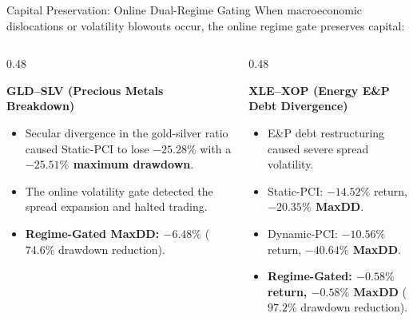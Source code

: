 \documentclass[10pt, aspectratio=169]{beamer}
\begin{document}
\begin{frame}{Capital Preservation: Online Dual-Regime Gating}
  When macroeconomic dislocations or volatility blowouts occur, the online regime gate preserves capital:
  \vspace{6pt}
  \begin{columns}[T]
    \begin{column}{0.48\textwidth}
      \begin{block}{\textbf{GLD--SLV (Precious Metals Breakdown)}}
        \begin{itemize}
          \item Secular divergence in the gold-silver ratio caused Static-PCI to lose $-25.28\%$ with a \textcolor{negred}{\textbf{$-25.51\%$ maximum drawdown}}.
          \item The online volatility gate detected the spread expansion and halted trading.
          \item \textbf{Regime-Gated MaxDD: \textcolor{posgreen}{$-6.48\%$}} ($\mathbf{74.6\%}$ drawdown reduction).
        \end{itemize}
      \end{block}
    \end{column}
    \begin{column}{0.48\textwidth}
      \begin{block}{\textbf{XLE--XOP (Energy E\&P Debt Divergence)}}
        \begin{itemize}
          \item E\&P debt restructuring caused severe spread volatility.
          \item Static-PCI: $-14.52\%$ return, \textcolor{negred}{\textbf{$-20.35\%$ MaxDD}}.
          \item Dynamic-PCI: $-10.56\%$ return, \textcolor{negred}{\textbf{$-40.64\%$ MaxDD}}.
          \item \textbf{Regime-Gated: \textcolor{posgreen}{$-0.58\%$ return, $-0.58\%$ MaxDD}} ($\mathbf{97.2\%}$ drawdown reduction).
        \end{itemize}
      \end{block}
    \end{column}
  \end{columns}
\end{frame}
\end{document}

